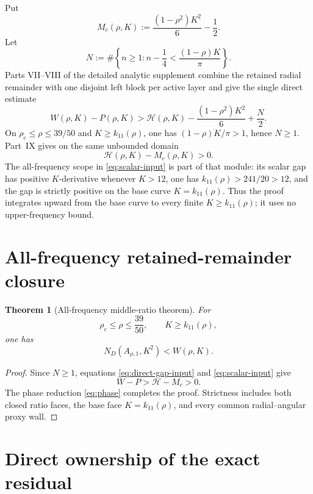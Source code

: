\documentclass[11pt]{article}
\newtheorem{theorem}{Theorem}
\newcommand{\ND}{N_D}
\begin{document}
Put
\[
 M_c(\rho,K):=\frac{(1-\rho^2)K^2}{6}-\frac12.
\]
Let
\begin{equation}
 N:=\#\left\{n\geq1:n-\frac14<\frac{(1-\rho)K}{\pi}\right\}.
 \label{eq:N}
\end{equation}
Parts VII--VIII of the detailed analytic supplement combine the retained
radial remainder with one disjoint left block per active layer and give the
single direct estimate
\begin{equation}
 W(\rho,K)-P(\rho,K)
 >\mathcal H(\rho,K)-\frac{(1-\rho^2)K^2}{6}+\frac N2.
 \label{eq:direct-gap-input}
\end{equation}
On
\(\rho_c\leq\rho\leq39/50\) and \(K\geq k_{11}(\rho)\),
one has \((1-\rho)K/\pi>1\), hence \(N\geq1\).  Part~IX gives on the same
unbounded domain
\begin{equation}
 \mathcal H(\rho,K)-M_c(\rho,K)>0.
 \label{eq:scalar-input}
\end{equation}
The all-frequency scope in \eqref{eq:scalar-input} is part of that module:
its scalar gap has positive \(K\)-derivative whenever \(K>12\), one has
\(k_{11}(\rho)>241/20>12\), and the gap is strictly positive on the base
curve \(K=k_{11}(\rho)\).  Thus the proof integrates upward from the base
curve to every finite \(K\geq k_{11}(\rho)\); it uses no upper-frequency
bound.

\section{All-frequency retained-remainder closure}

\begin{theorem}[All-frequency middle-ratio theorem]
\label{thm:all-frequency}
For
\[
 \rho_c\leq\rho\leq\frac{39}{50},
 \qquad
 K\geq k_{11}(\rho),
\]
one has
\[
 \ND(A_{\rho,1},K^2)<W(\rho,K).
\]
\end{theorem}

\begin{proof}
Since \(N\geq1\), equations \eqref{eq:direct-gap-input} and
\eqref{eq:scalar-input} give
\[
 W-P>\mathcal H-M_c>0.
\]
The phase reduction \eqref{eq:phase} completes the proof.  Strictness includes
both closed ratio faces, the base face \(K=k_{11}(\rho)\), and every common
radial--angular proxy wall.
\end{proof}

\section{Direct ownership of the exact residual}
\end{document}
